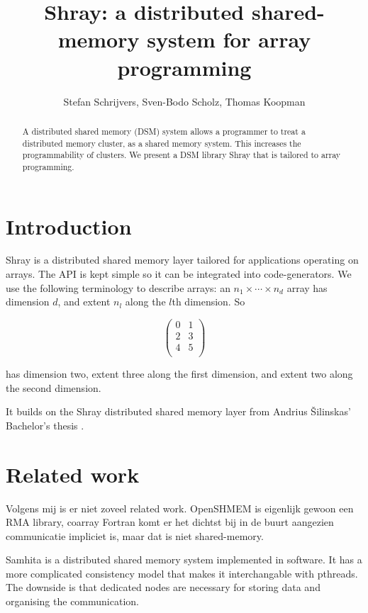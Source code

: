 \documentclass{article}
\author{Stefan Schrijvers, Sven-Bodo Scholz, Thomas Koopman}
\title{Shray: a distributed shared-memory system for array programming}
\begin{document}
\maketitle

\begin{abstract}

A distributed shared memory (DSM) system allows a programmer to treat a distributed memory 
cluster, as a shared memory system. This increases the programmability of clusters. 
We present a DSM library Shray that is tailored to array programming. 

\end{abstract}

\section*{Introduction}

Shray is a distributed shared memory layer tailored for applications operating on arrays.
The API is kept simple so it can be integrated into code-generators. We use the following 
terminology to describe arrays: an $n_1 \times \cdots \times n_d$ array has dimension $d$,
and extent $n_l$ along the $l$th dimension. So 

\[
\begin{pmatrix}
    0 & 1 \\
    2 & 3 \\
    4 & 5 \\
\end{pmatrix}
\]

has dimension two, extent three along the first dimension, and extent two along the second 
dimension.  

\medskip

It builds on the Shray distributed shared memory layer from Andrius Šilinskas'
Bachelor's thesis \cite{Silinskas15}.

\section{Related work}

Volgens mij is er niet zoveel related work. OpenSHMEM is eigenlijk gewoon een RMA library, coarray Fortran komt
er het dichtst bij in de buurt aangezien communicatie impliciet is, maar dat is niet shared-memory.

Samhita \cite{Ramesh11} is a distributed shared memory system implemented in software. It has a more complicated
consistency model that makes it interchangable with pthreads. The downside is that dedicated nodes are necessary 
for storing data and organising the communication.
\end{document}
